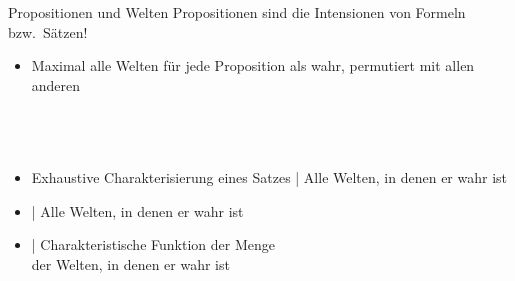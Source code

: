 \begin{frame}
  {Propositionen und Welten}
  \onslide<+->
  \onslide<+->
  Propositionen sind die Intensionen von Formeln bzw.\ Sätzen!\\
  \Halbzeile
  \begin{itemize}[<+->]
    \item Maximal alle Welten für jede Proposition als wahr, permutiert mit allen anderen\\
      \\
      \\
      \\
    \item Exhaustive Charakterisierung eines Satzes | \alert{Alle Welten, in denen er wahr ist}
    \item {} | \alert{Alle Welten, in denen er wahr ist}
      \Halbzeile
    \item {} | \alert{Charakteristische Funktion} der Menge\\
      der \alert{Welten, in denen er wahr ist} 
  \end{itemize}
\end{frame}


